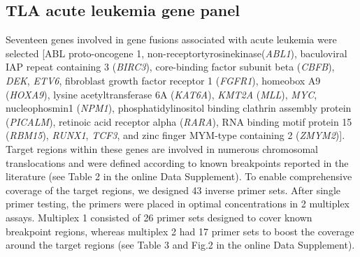 \subsection{TLA acute leukemia gene panel}
Seventeen genes involved in gene fusions associated with acute leukemia were selected [ABL proto-oncogene 1, non-receptortyrosinekinase(\textsl{ABL1}), baculoviral IAP repeat containing 3 (\textsl{BIRC3}), core-binding factor subunit beta (\textsl{CBFB}), \textsl{DEK}, \textsl{ETV6}, fibroblast growth factor receptor 1 (\textsl{FGFR1}), homeobox A9 (\textsl{HOXA9}), lysine acetyltransferase 6A (\textsl{KAT6A}), \textsl{KMT2A} (\textsl{MLL}), \textsl{MYC}, nucleophosmin1 (\textsl{NPM1}), phosphatidylinositol binding clathrin assembly protein (\textsl{PICALM}), retinoic acid receptor alpha (\textsl{RARA}), RNA binding motif protein 15 (\textsl{RBM15}), \textsl{RUNX1}, \textsl{TCF3}, and zinc finger MYM-type containing 2 (\textsl{ZMYM2})]. 
Target regions within these genes are involved in numerous chromosomal translocations and were defined according to known breakpoints reported in the literature\cite{Shaffer_2012, Mitelman_2017, Mertens_2015, Duncavage_2012, Bohlander_2000} (see Table 2 in the online Data Supplement).
To enable comprehensive coverage of the target regions, we designed 43 inverse primer sets. 
After single primer testing, the primers were placed in optimal concentrations in 2 multiplex assays. 
Multiplex 1 consisted of 26 primer sets designed to cover known breakpoint regions, whereas multiplex 2 had 17 primer sets to boost the coverage around the target regions (see Table 3 and Fig.2 in the online Data Supplement).

